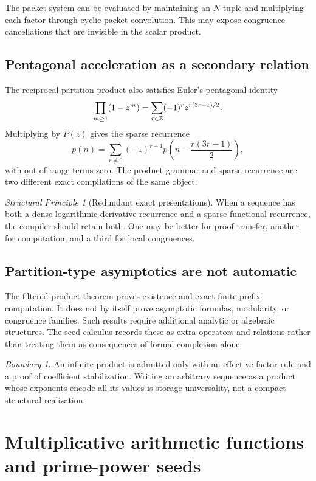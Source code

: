 \documentclass[11pt]{article}
\theoremstyle{definition}\newtheorem{definition}[theorem]{Definition}\newtheorem{example}[theorem]{Example}\newtheorem{construction}[theorem]{Construction}\newtheorem{algorithm}[theorem]{Algorithm}\newtheorem{conjecture}[theorem]{Conjecture}\newtheorem{problem}[theorem]{Problem}
\theoremstyle{remark}\newtheorem{remark}[theorem]{Remark}\newtheorem{boundary}[theorem]{Boundary}\newtheorem{certificate}[theorem]{Computational Certificate}\newtheorem{classical}[theorem]{Classical Input}\newtheorem{principle}[theorem]{Structural Principle}
\begin{document}
The packet system can be evaluated by maintaining an $N$-tuple and multiplying each factor through cyclic packet convolution.  This may expose congruence cancellations that are invisible in the scalar product.

\subsection{Pentagonal acceleration as a secondary relation}
The reciprocal partition product also satisfies Euler's pentagonal identity
\[
 \prod_{m\geq1}(1-z^m)
 =\sum_{r\in\mathbb Z}(-1)^r z^{r(3r-1)/2}.
\]
Multiplying by $P(z)$ gives the sparse recurrence
\[
 p(n)=\sum_{r\neq0}(-1)^{r+1}p\!\left(n-\frac{r(3r-1)}2\right),
\]
with out-of-range terms zero.  The product grammar and sparse recurrence are two different exact compilations of the same object.

\begin{principle}[Redundant exact presentations]
When a sequence has both a dense logarithmic-derivative recurrence and a sparse functional recurrence, the compiler should retain both.  One may be better for proof transfer, another for computation, and a third for local congruences.
\end{principle}

\subsection{Partition-type asymptotics are not automatic}
The filtered product theorem proves existence and exact finite-prefix computation.  It does not by itself prove asymptotic formulas, modularity, or congruence families.  Such results require additional analytic or algebraic structures.  The seed calculus records these as extra operators and relations rather than treating them as consequences of formal completion alone.

\begin{boundary}
An infinite product is admitted only with an effective factor rule and a proof of coefficient stabilization.  Writing an arbitrary sequence as a product whose exponents encode all its values is storage universality, not a compact structural realization.
\end{boundary}


\section{Multiplicative arithmetic functions and prime-power seeds}
\end{document}
